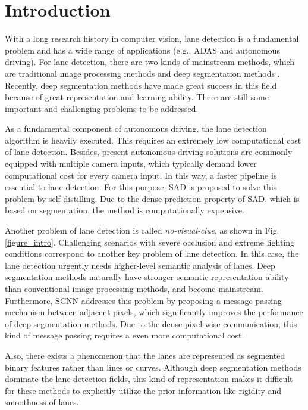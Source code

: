 \documentclass[runningheads]{llncs}
\begin{document}
\section{Introduction}
With a long research history in computer vision, lane detection is a fundamental problem and has a wide range of applications \cite{hillel2014recent} (e.g., ADAS and autonomous driving). 
For lane detection, there are two kinds of mainstream methods, which are traditional image processing methods \cite{bertozzi1998gold,wang2004lane,aly2008real} and deep segmentation methods  \cite{Empirical_Evaluation,SCNN,End-to-End}. Recently, deep segmentation methods have made great success in this field because of great representation and learning ability. There are still some important and challenging problems to be addressed.

As a fundamental component of autonomous driving, the lane detection algorithm is heavily executed. This requires an extremely low computational cost of lane detection. Besides, present autonomous driving solutions are commonly equipped with multiple camera inputs, which typically demand lower computational cost for every camera input. In this way, a faster pipeline is essential to lane detection. For this purpose, SAD \cite{SAD} is proposed to solve this problem by self-distilling. Due to the dense prediction property of SAD, which is based on segmentation, the method is computationally expensive. 

Another problem of lane detection is called \textit{no-visual-clue}, as shown in Fig. \ref{figure_intro}. Challenging scenarios with severe occlusion and extreme lighting conditions correspond to another key problem of lane detection. In this case, the lane detection urgently needs higher-level semantic analysis of lanes. Deep segmentation methods naturally have stronger semantic representation ability than conventional image processing methods, and become mainstream. Furthermore, SCNN \cite{SCNN} addresses this problem by proposing a message passing mechanism between adjacent pixels, which significantly improves the performance of deep segmentation methods. Due to the dense pixel-wise communication, this kind of message passing requires a even more computational cost.

 Also, there exists a phenomenon that the lanes are represented as segmented binary features rather than lines or curves. Although deep segmentation methods dominate the lane detection fields, this kind of representation makes it difficult for these methods to explicitly utilize the prior information like rigidity and smoothness of lanes.
\end{document}
